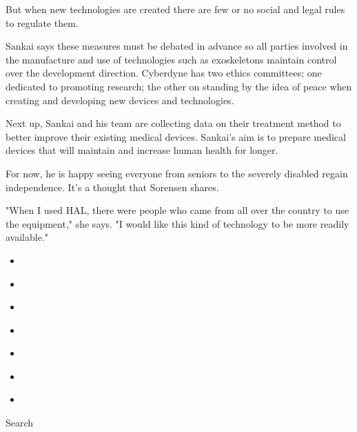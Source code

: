 But when new technologies are created there are few or no social and
legal rules to regulate them.

Sankai says these measures must be debated in advance so all parties
involved in the manufacture and use of technologies such as exoskeletons
maintain control over the development direction. Cyberdyne has two
ethics committees; one dedicated to promoting research; the other on
standing by the idea of peace when creating and developing new devices
and technologies.

Next up, Sankai and his team are collecting data on their treatment
method to better improve their existing medical devices. Sankai's aim is
to prepare medical devices that will maintain and increase human health
for longer.

For now, he is happy seeing everyone from seniors to the severely
disabled regain independence. It's a thought that Sorensen shares.

"When I used HAL, there were people who came from all over the country
to use the equipment," she says. "I would like this kind of technology
to be more readily available."

\begin{itemize}
\item
\end{itemize}

\begin{itemize}
\item
\end{itemize}

\begin{itemize}
\item
\end{itemize}

\begin{itemize}
\item
\end{itemize}

\begin{itemize}
\item
\end{itemize}

\begin{itemize}
\item
\end{itemize}

\begin{itemize}
\item
\end{itemize}

Search

